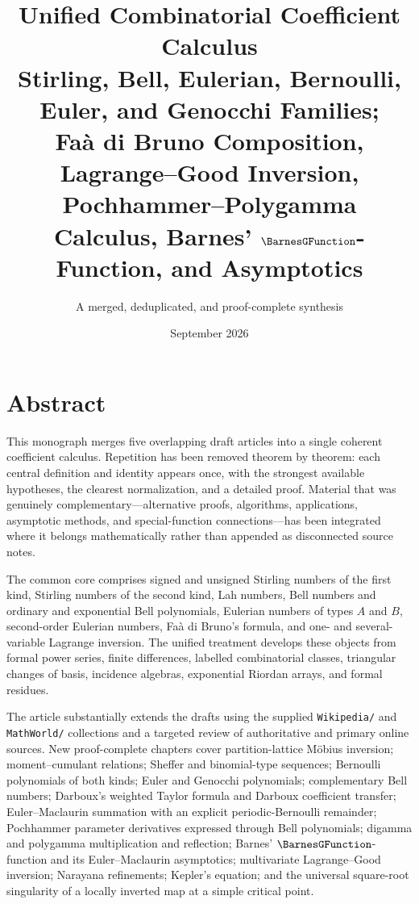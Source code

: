 \documentclass[11pt,a4paper,oneside,openany]{book}
\title{\Huge\bfseries Unified Combinatorial Coefficient Calculus\\[4mm]
\Large Stirling, Bell, Eulerian, Bernoulli, Euler, and Genocchi Families;\\
Fa\`a di Bruno Composition, Lagrange--Good Inversion,\\
Pochhammer--Polygamma Calculus, Barnes' $\BarnesGFunction$-Function, and Asymptotics}
\author{A merged, deduplicated, and proof-complete synthesis}
\date{September 2026}
\theoremstyle{definition}
\theoremstyle{remark}
\begin{document}
\frontmatter
\hypersetup{pageanchor=false}
\maketitle
\hypersetup{pageanchor=true}

\chapter*{Abstract}
This monograph merges five overlapping draft articles into a single coherent
coefficient calculus.  Repetition has been removed theorem by theorem: each
central definition and identity appears once, with the strongest available
hypotheses, the clearest normalization, and a detailed proof.  Material that was
genuinely complementary---alternative proofs, algorithms, applications,
asymptotic methods, and special-function connections---has been integrated where
it belongs mathematically rather than appended as disconnected source notes.

The common core comprises signed and unsigned Stirling numbers of the first kind,
Stirling numbers of the second kind, Lah numbers, Bell numbers and ordinary and
exponential Bell polynomials, Eulerian numbers of types $A$ and $B$, second-order
Eulerian numbers, Fa\`a di Bruno's formula, and one- and several-variable Lagrange
inversion.  The unified treatment develops these objects from formal power
series, finite differences, labelled combinatorial classes, triangular changes of
basis, incidence algebras, exponential Riordan arrays, and formal residues.

The article substantially extends the drafts using the supplied \nolinkurl{Wikipedia/}
and \nolinkurl{MathWorld/} collections and a targeted review of authoritative and
primary online sources.  New proof-complete chapters cover partition-lattice
Möbius inversion; moment--cumulant relations; Sheffer and binomial-type sequences;
Bernoulli polynomials of both kinds; Euler and Genocchi polynomials; complementary
Bell numbers; Darboux's weighted Taylor formula and Darboux coefficient transfer;
Euler--Maclaurin summation with an explicit periodic-Bernoulli remainder;
Pochhammer parameter derivatives expressed through Bell polynomials; digamma and
polygamma multiplication and reflection; Barnes' $\BarnesGFunction$-function and its
Euler--Maclaurin asymptotics; multivariate Lagrange--Good inversion; Narayana
refinements; Kepler's equation; and the universal square-root singularity of a
locally inverted map at a simple critical point.
\end{document}
